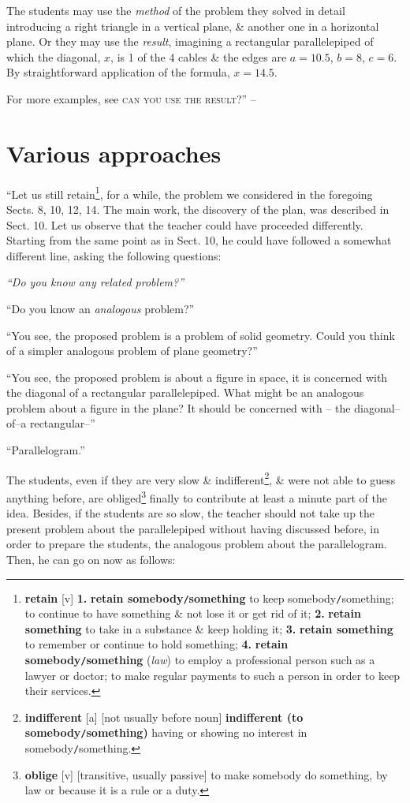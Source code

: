 \documentclass[oneside]{book}
\numberwithin{equation}{section}
\begin{document}
The students may use the \textit{method} of the problem they solved in detail introducing a right triangle in a vertical plane, \& another one in a horizontal plane. Or they may use the \textit{result}, imagining a rectangular parallelepiped of which the diagonal, $x$, is 1 of the 4 cables \& the edges are $a = 10.5$, $b = 8$, $c = 6$. By straightforward application of the formula, $x = 14.5$.

For more examples, see \textsc{can you use the result?}'' -- \cite[pp. 16--19]{Polya2014}

\section{Various approaches}
``Let us still retain\footnote{\textbf{retain} [v] \textbf{1.} \textbf{retain somebody\texttt{/}something} to keep somebody\texttt{/}something; to continue to have something \& not lose it or get rid of it; \textbf{2.} \textbf{retain something} to take in a substance \& keep holding it; \textbf{3.} \textbf{retain something} to remember or continue to hold something; \textbf{4.} \textbf{retain somebody\texttt{/}something} (\textit{law}) to employ a professional person such as a lawyer or doctor; to make regular payments to such a person in order to keep their services.}, for a while, the problem we considered in the foregoing Sects. 8, 10, 12, 14. The main work, the discovery of the plan, was described in Sect. 10. Let us observe that the teacher could have proceeded differently. Starting from the same point as in Sect. 10, he could have followed a somewhat different line, asking the following questions:

\textit{``Do you know any related problem?''}

``Do you know an \textit{analogous} problem?''

``You see, the proposed problem is a problem of solid geometry. Could you think of a simpler analogous problem of plane geometry?''

``You see, the proposed problem is about a figure in space, it is concerned with the diagonal of a rectangular parallelepiped. What might be an analogous problem about a figure in the plane? It should be concerned with -- the diagonal--of--a rectangular--''

``Parallelogram.''

The students, even if they are very slow \& indifferent\footnote{\textbf{indifferent} [a] [not usually before noun] \textbf{indifferent (to somebody\texttt{/}something)} having or showing no interest in somebody\texttt{/}something.}, \& were not able to guess anything before, are obliged\footnote{\textbf{oblige} [v] [transitive, usually passive] to make somebody do something, by law or because it is a rule or a duty.} finally to contribute at least a minute part of the idea. Besides, if the students are so slow, the teacher should not take up the present problem about the parallelepiped without having discussed before, in order to prepare the students, the analogous problem about the parallelogram. Then, he can go on now as follows:
\end{document}

